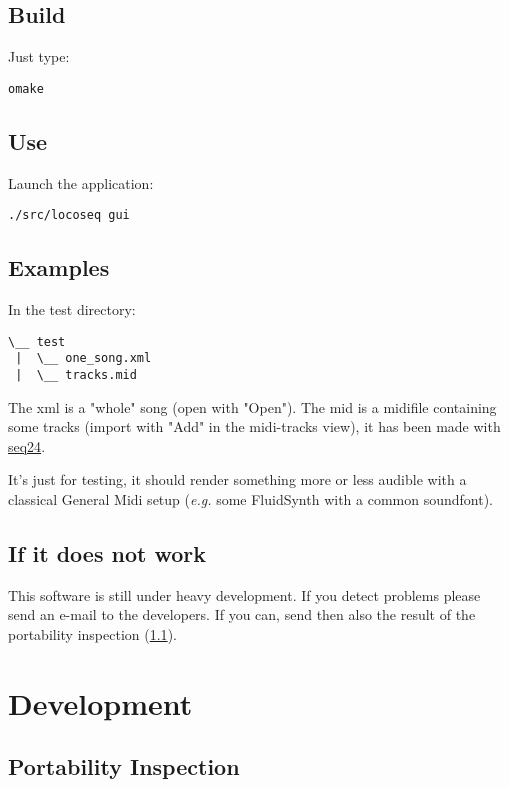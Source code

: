 \subsection{Build}
Just type:

\begin{verbatim}
omake
\end{verbatim}

\subsection{Use}
Launch the application:

\begin{verbatim}
./src/locoseq gui
\end{verbatim}

\subsection{Examples}
In the test directory:

\begin{verbatim}
\__ test
 |  \__ one_song.xml
 |  \__ tracks.mid
\end{verbatim}

The xml is a "whole" song (open with "Open").  The mid is a midifile containing
some tracks (import with "Add" in the midi-tracks view), it has been made with
\href{http://www.filter24.org/seq24/}{seq24}.

It's just for testing, it should render something more or less audible with a
classical General Midi setup (\textit{e.g.} some FluidSynth with a common
soundfont).

\subsection{If it does not work}

This software is still under heavy development. If you detect problems please
send an e-mail to the developers. If you can, send then also the result of the
portability inspection (\ref{inspect}).


\section{Development}

\subsection{Portability Inspection}
\label{inspect}

